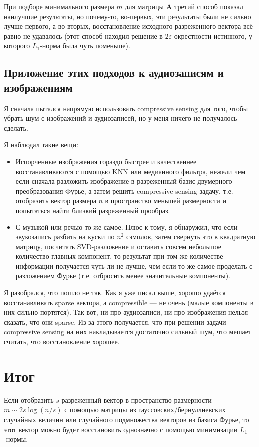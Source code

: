 \documentclass{article}
\def\*#1{\mathbf{#1}}
\begin{document}
    При подборе минимального размера $m$ для матрицы $\*A$ третий способ показал наилучшие результаты, но почему-то, во-первых, эти результаты были не сильно лучше первого, а во-вторых, восстановление исходного разреженного вектора всё равно не удавалось (этот способ находил решение в $2\varepsilon$-окрестности истинного, у которого $L_1$-норма была чуть поменьше).

\subsection{Приложение этих подходов к аудиозаписям и изображениям}

Я сначала пытался напрямую использовать compressive sensing для того, чтобы убрать шум с изображений и аудиозаписей, но у меня ничего не получалось сделать. 

Я наблюдал такие вещи:

\begin{itemize}
	\item Испорченные изображения гораздо быстрее и качественнее восстанавливаются с помощью KNN или медианного фильтра, нежели чем если сначала разложить изображение в разреженный базис двумерного преобразования Фурье, а затем решить compressive sensing задачу, т.е. отобразить вектор размера $n$ в пространство меньшей размерности и попытаться найти близкий разреженный прообраз.
	
	\item С музыкой или речью то же самое. Плюс к тому, я обнаружил, что если звукозапись разбить на куски по $n^2$ сэмплов, затем свернуть это в квадратную матрицу, посчитать SVD-разложение и оставить совсем небольшое количество главных компонент, то результат при том же количестве информации получается чуть ли не лучше, чем если то же самое проделать с разложением Фурье (т.е. отбросить менее значительные компоненты).
\end{itemize}

Я разобрался, что пошло не так. Как я уже писал выше, хорошо удаётся восстанавливать sparse вектора, а compressible --- не очень (малые компоненты в них сильно портятся). Так вот, ни про аудиозаписи, ни про изображения нельзя сказать, что они sparse. Из-за этого получается, что при решении задачи compressive sensing на них накладывается достаточно сильный шум, что мешает считать, что восстановление хорошее.

\section{Итог}

Если отобразить $s$-разреженный вектор в пространство размерности $m \sim 2s\log(n/s)$ с помощью матрицы из гауссовских/бернуллиевских случайных величин или случайного подмножества векторов из базиса Фурье, то этот вектор можно будет восстановить однозначно с помощью минимизации $L_1$-нормы.
\end{document}
